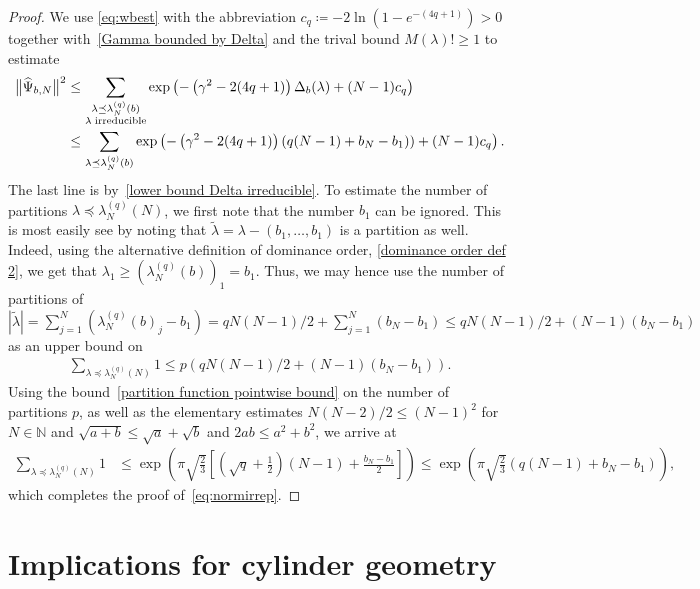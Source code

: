 \documentclass[letterpaper, DIV=17]{scrartcl}
\numberwithin{equation}{section}
\theoremstyle{definition}
\newcommand{\irr}{\small \textrm{irreducible}}
\begin{document}
\begin{proof}
	We use \eqref{eq:wbest} with the abbreviation $ c_q \coloneqq - 2\ln  (1- e^{-(4q+1)} ) > 0 $ together with~\eqref{Gamma bounded by Delta} and the trival bound $ M(\lambda)! \geq 1 $ to estimate
	\begin{align*}
		\big\| \widehat \Psi_{b,N} \big\|^2  & \leq  \sum_{\substack{ \lambda \preceq \lambda_N^{(q)}(b)  \\ \lambda \; \irr } }  \exp\left( - \left( \gamma^2 - 2(4q+1) \right) \Delta_b(\lambda)  + (N-1) c_q  \right) \\
		& \leq   \sum_{\lambda \preceq \lambda_N^{(q)}(b) }  \exp\left( - \left( \gamma^2 - 2(4q+1) \right)\left( q(N-1) + b_N - b_1\right)) + (N-1) c_q  \right)  . 
	\end{align*}
	The last line is by~\eqref{lower bound Delta irreducible}. 
	To estimate the number of partitions  $\lambda\preceq \lambda_N^{(q)}(N)$, we first note that the number $ b_1 $ can be ignored. This is most easily see by noting that $\tilde{\lambda}=\lambda-(b_1, \dots, b_1)$ is a partition as well. Indeed, using the alternative definition of dominance order, \eqref{dominance order def 2}, we get that $\lambda_1\geq (\lambda_N^{(q)}(b))_1=b_1$. Thus, we may hence use the number of partitions of $ |\tilde{\lambda} | = \sum_{j=1}^N ( \lambda_N^{(q)}(b)_j -b_1) = qN(N-1)/2+ \sum_{j=1}^N (b_N-b_1) \leq qN(N-1)/2+(N-1)(b_N-b_1) $ as an upper bound on
	\begin{align*}
		\sum_{\lambda\preceq \lambda_N^{(q)}(N)} 1
		\leq p\left(qN(N-1)/2+(N-1)(b_N-b_1)\right).
		\end{align*}
	Using the bound~\eqref{partition function pointwise bound} on the number of partitions $ p $, as well as the elementary estimates $N(N-2)/2\leq (N-1)^2$ for $N\in \mathbb{N}$ and $\sqrt{a+b}\leq \sqrt{a}+\sqrt{b}$ and $2ab \leq a^2+b^2$, we arrive at
	\begin{align*}
		\sum_{\lambda\preceq \lambda_N^{(q)}(N)} 1 
		&\leq \exp\left(\pi \sqrt{\frac{2}{3}}  \left[\left(\sqrt{q}+\frac{1}{2}\right)(N-1)+\frac{b_N-b_1}{2}\right]\right) \leq \exp\left( \pi \sqrt{\frac{2}{3}} \left(q(N-1)+b_N-b_1\right)\right), 
		\end{align*}
	 which completes the proof of~\eqref{eq:normirrep}.
%	
\end{proof}

\section{Implications for cylinder geometry}
\end{document}
